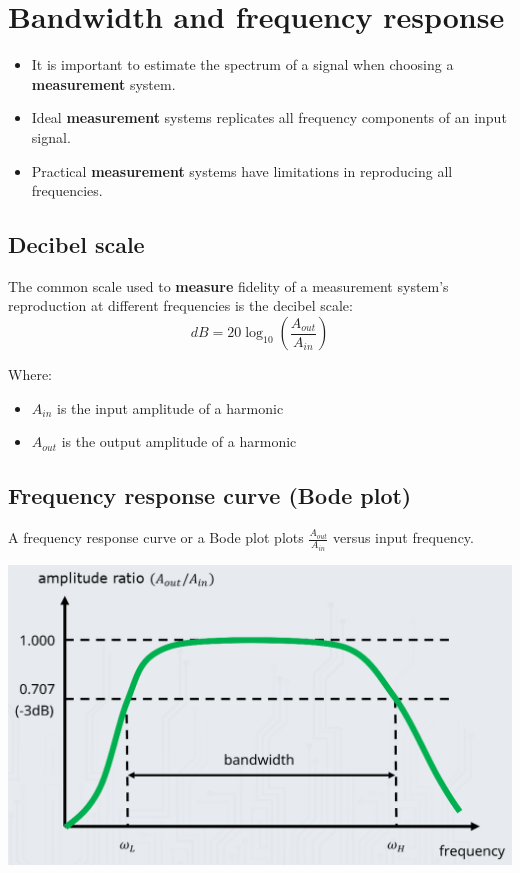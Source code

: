 \documentclass[11pt]{article}
\begin{document}
 \newpage
\section{Bandwidth and frequency response}
\label{sec:org1906fd8}
\begin{itemize}
\item It is important to estimate the spectrum of a signal when choosing a \textbf{measurement} system.
\item Ideal \textbf{measurement} systems replicates all frequency components of an input signal.
\item Practical \textbf{measurement} systems have limitations in reproducing all frequencies.
\end{itemize}
\subsection{Decibel scale}
\label{sec:org6744878}
The common scale used to \textbf{measure} fidelity of a measurement system's reproduction at different frequencies is the decibel scale:
\[dB = 20 \log_{10} \left(\frac{A_{out}}{A_{in}} \right)\]

Where:
\begin{itemize}
\item \(A_{in}\) is the input amplitude of a harmonic
\item \(A_{out}\) is the output amplitude of a harmonic
\end{itemize}
\subsection{Frequency response curve (Bode plot)}
\label{sec:orgcb26f1c}
A frequency response curve or a Bode plot plots \(\frac{A_{out}}{A_{in}}\) versus input frequency.

\begin{center}
\includegraphics[width=.9\linewidth]{./images/frequency-response-curve.png}
\end{center}
\end{document}
